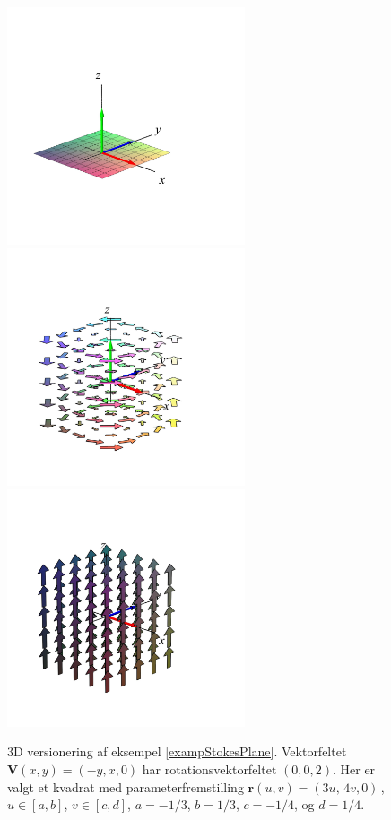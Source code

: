 \begin{figure}[h]
\centerline{\includegraphics[height=70mm]{FIGS/plotFlat1}\includegraphics[height=70mm]{FIGS/plotFlat2}\includegraphics[height=70mm]{FIGS/plotFlat3}}
\begin{center}
\caption{\small{3D versionering af eksempel \ref{exampStokesPlane}. Vektorfeltet $\mathbf{V}(x,y) = (-y, x, 0)$ har rotationsvektorfeltet $(0,0,2)$. Her er valgt et kvadrat med parameterfremstilling $\mathbf{r}(u,v) = (3u,\, 4v, 0)\,$, $u \in [a, b]$, $v \in [c,d]$, $a=-1/3$, $b=1/3$, $c=-1/4$, og $d=1/4$.}}
\label{figFlatStokesA}
\end{center}
\end{figure}


